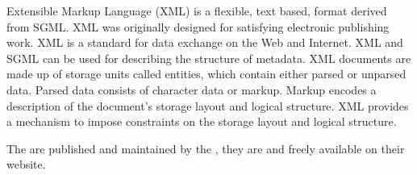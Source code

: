 \documentclass[12pt]{article}
\begin{document}
          Extensible Markup Language (XML) is a flexible, text based, format derived from SGML. XML was originally designed for satisfying electronic publishing work. XML is a standard for data exchange on the Web and Internet. 
XML and SGML can be used for describing the structure of metadata. 
          XML documents are made up of storage units called entities, which contain either parsed or unparsed data. Parsed data consists of character data or markup. Markup encodes a description of the document's storage layout and logical structure. XML provides a mechanism to impose constraints on the storage layout and logical structure.

The  are published and maintained by the , they are  and freely available on their website.
\end{document}
